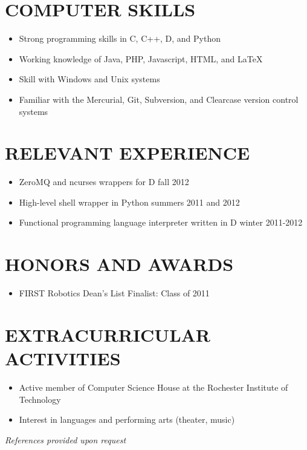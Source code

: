 \documentclass{res}
\begin{document}
\begin{resume}
\section{COMPUTER SKILLS}
	\begin{itemize}
    \item Strong programming skills in C, C++, D, and Python
    \item Working knowledge of Java, PHP, Javascript, HTML, and LaTeX
    \item Skill with Windows and Unix systems
    \item Familiar with the Mercurial, Git, Subversion, and Clearcase version control systems
    \end{itemize}

\section{RELEVANT EXPERIENCE}
	\begin{itemize}
    \item ZeroMQ and ncurses wrappers for D fall 2012
    \item High-level shell wrapper in Python summers 2011 and 2012
    \item Functional programming language interpreter written in D winter 2011-2012
    \end{itemize}

\section{HONORS AND AWARDS}
	\begin{itemize}
    \item FIRST Robotics Dean's List Finalist: Class of 2011
    \end{itemize}

\section{EXTRACURRICULAR ACTIVITIES}
	\begin{itemize}
    \item Active member of Computer Science House at the Rochester Institute of Technology
    \item Interest in languages and performing arts (theater, music)
    \end{itemize}

\begin{center}
\hspace{-0.8in}\emph{References provided upon request\\[8pt]}
\end{center}

\end{resume}
\end{document}
